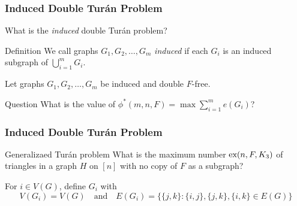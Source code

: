 \documentclass{beamer}
\newcommand*{\ex}{\textnormal{ex}}
\begin{document}
\begin{frame}
  \frametitle{Induced Double Turán Problem}

  What is the \textit{induced} double Turán problem? \pause

  \begin{block}{Definition}
    We call graphs $G_1, G_2, \ldots, G_m$ \textit{induced} if each $G_i$ is an induced subgraph of $\bigcup_{i = 1}^m G_i$.
  \end{block}

  \pause

  \vspace{0.5cm}

  Let graphs $G_1, G_2, \ldots, G_m$ be induced and double $F$-free.

  \begin{block}{Question}
    What is the value of $\phi^*(m, n, F) = \max \sum_{i = 1}^m e(G_i)$?
  \end{block}
\end{frame}

\begin{frame}
  \frametitle{Induced Double Turán Problem}

  \begin{block}{Generalizaed Turán problem}
    What is the maximum number $\ex(n, F, K_3)$ of triangles in a graph $H$ on $[n]$ with no copy of $F$ as a subgraph?
  \end{block}

  \pause 

  \vspace{0.5cm}

  For $i \in V(G)$, define $G_i$ with
  \[
    V(G_i) = V(G) \quad \text{and} \quad E(G_i) = \{\{j, k\} : \{i, j\}, \{j, k\}, \{i, k\} \in E(G)\}
  \]
\end{frame}
\end{document}
